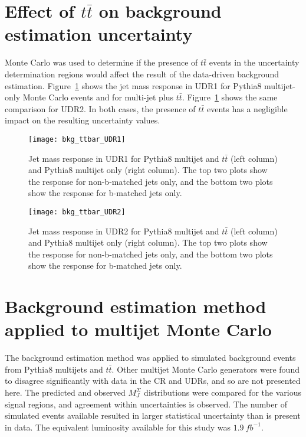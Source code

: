 \section{Effect of $t\bar{t}$ on background estimation uncertainty}\label{sec:bkg_ttbar}

Monte Carlo was used to determine if the presence of $t\bar{t}$ events in the uncertainty determination regions would affect the result of the data-driven background estimation.
Figure~\ref{fig:ttbar_UDR1} shows the jet mass response in UDR1 for Pythia8 multijet-only Monte Carlo events and for multi-jet plus $t\bar{t}$.
Figure~\ref{fig:ttbar_UDR1} shows the same comparison for UDR2.
In both cases, the presence of $t\bar{t}$ events has a negligible impact on the resulting uncertainty values.

\begin{figure}[!ht]
    \centering
    \texttt{[image: bkg\_ttbar\_UDR1]}
    \caption{Jet mass response in UDR1 for Pythia8 multijet and $t\bar{t}$ (left column) and Pythia8 multijet only (right column).
    The top two plots show the response for non-b-matched jets only, and the bottom two plots show the response for b-matched jets only.}
    \label{fig:ttbar_UDR1}
\end{figure}

\begin{figure}[!ht]
    \centering
    \texttt{[image: bkg\_ttbar\_UDR2]}
    \caption{Jet mass response in UDR2 for Pythia8 multijet and $t\bar{t}$ (left column) and Pythia8 multijet only (right column).
    The top two plots show the response for non-b-matched jets only, and the bottom two plots show the response for b-matched jets only.}

    \label{fig:ttbar_UDR2}
\end{figure}

\section{Background estimation method applied to multijet Monte Carlo}\label{sec:bkg_monte_carlo}

The background estimation method was applied to simulated background events from Pythia8 multijets and $t\bar{t}$.
Other multijet Monte Carlo generators were found to disagree significantly with data in the CR and UDRs, and so are not presented here.
The predicted and observed $M_{J}^{\Sigma}$ distributions were compared for the various signal regions, and agreement within uncertainties is observed.
The number of simulated events available resulted in larger statistical uncertainty than is present in data.
The equivalent luminosity available for this study was $1.9~fb^{-1}$.

